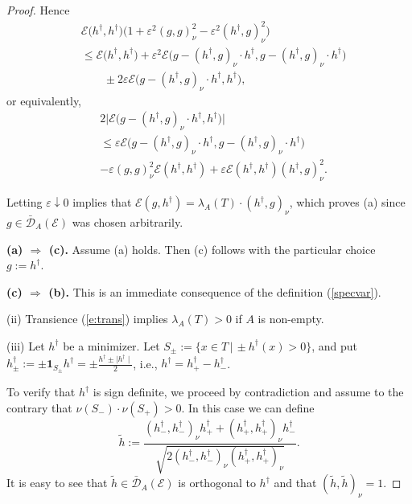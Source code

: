 \documentclass[11pt]{amsart}
\numberwithin{equation}{section}
\begin{document}
{\begin{proof}
Hence
{\begin{equation}\label{emindag0}
\begin{aligned}
 &{\mathcal E}\big(h^\dagger,h^\dagger\big)\big(1+\varepsilon^2(g,g)^2_\nu-\varepsilon^2(h^\dagger,g)^2_\nu\big)
  \\
 &\leq
   {\mathcal E}\big(h^\dagger,h^\dagger\big)+
\varepsilon^2{\mathcal E}\big(g-(h^\dagger,g)_{\nu}\cdot h^\dagger,g-(h^\dagger,g)_{\nu}\cdot h^\dagger\big)
  \\
 &\qquad\pm 2\varepsilon {\mathcal E}\big(g-(h^\dagger,g)_{\nu}\cdot h^\dagger,h^\dagger\big),
\end{aligned}
\end{equation}}
or equivalently,
{\begin{equation}\label{emin3dag}
\begin{aligned}
   &2\big|{\mathcal E}\big(g-(h^\dagger,g)_{\nu}\cdot h^\dagger,h^\dagger\big)\big|
  \\
 &\le
   \varepsilon{\mathcal E}\big(g-(h^\dagger,g)_{\nu}\cdot h^\dagger,g-(h^\dagger,g)_{\nu}\cdot h^\dagger\big)\\&-\varepsilon(g,g)^2_\nu{\mathcal E}(h^\dagger,h^\dagger)+\varepsilon{\mathcal E}(h^\dagger,h^\dagger)(h^\dagger,g)^2_\nu.
\end{aligned}
\end{equation}}

Letting $\varepsilon\downarrow 0$ implies that ${\mathcal E}(g,h^\dagger)=\lambda_A(T)\cdot(h^\dagger,g)_{\nu}$, which proves (a) since
$g\in\bar{\mathcal D}_{A}({\mathcal E})$ was chosen arbitrarily.{\smallskip}

{\bf (a) $\Longrightarrow$ (c).} Assume (a) holds. Then (c) follows with the particular choice $g:=h^\dagger$. {\smallskip}

{\bf (c) $\Longrightarrow$ (b).} This is an immediate consequence of the definition (\ref{specvar}). {\smallskip}

(ii) Transience (\ref{e:trans}) implies $\lambda_A(T)>0$ if
$A$ is non-empty.{\smallskip}

(iii)
 Let $h^\dagger$ be a minimizer. Let
$S_\pm:=\{x\in T\,|\,\pm h^\dagger(x)>0\}$, and put
$h_\pm^\dagger:=\pm\mathbf 1_{S_\pm} h^\dagger = \pm \frac{h^\dagger \pm \mid h^\dagger\mid}{2}$, i.e., $h^\dagger=h^\dagger_+-h^\dagger_-$.

 To  verify that $h^\dagger$ is sign definite, we proceed by contradiction and
assume to the contrary that  $\nu(S_-)\cdot\nu(S_+)>0$.
In this case we can define
\begin{equation}
\label{e:004}
  \tilde{h}
 :=
  \frac{(h_-^\dagger,h_-^\dagger)_\nu h_+^\dagger+(h^\dagger_+,h^\dagger_+)_\nu h_-^\dagger}{\sqrt{2(h_-^\dagger,h_-^\dagger)_\nu(h^\dagger_+,h^\dagger_+)_\nu}} .
\end{equation}
It is easy to see that $\tilde{h}\in\bar{{\mathcal D}}_A({\mathcal E})$ is orthogonal to $h^\dagger$ and that
$(\tilde{h},\tilde{h})_\nu=1$.


\end{proof}}
\end{document}
